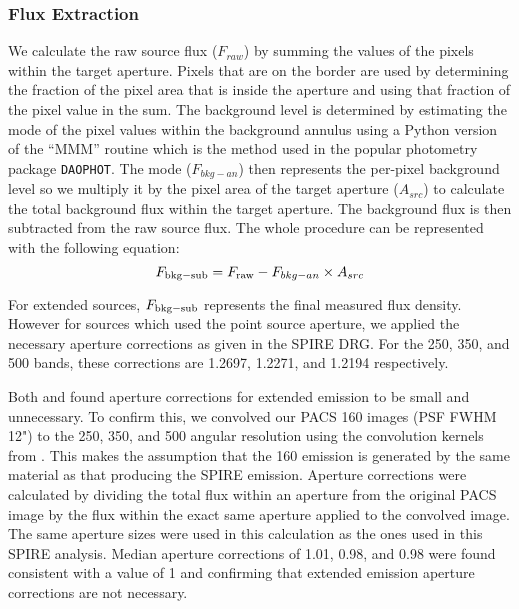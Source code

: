 \subsubsection{Flux Extraction}
We calculate the raw source flux ($F_{raw}$) by summing the values of the pixels within the target aperture. Pixels that are on the border are used by determining the fraction of the pixel area that is inside the aperture and using that fraction of the pixel value in the sum. The background level is determined by estimating the mode of the pixel values within the background annulus using a Python version of the ``MMM'' routine which is the method used in the popular photometry package \texttt{DAOPHOT}. The mode ($F_{bkg-an}$) then represents the per-pixel background level so we multiply it by the pixel area of the target aperture ($A_{src}$) to calculate the total background flux within the target aperture. The background flux is then subtracted from the raw source flux. The whole procedure can be represented with the following equation:
\begin{equation}
F_{\rm{bkg-sub}} = F_{\rm{raw}} - F_{bkg-an} \times A_{src}
\end{equation}

For extended sources, $F_{\rm{bkg-sub}}$ represents the final measured flux density. However for sources which used the point source aperture, we applied the necessary aperture corrections as given in the SPIRE DRG. For the 250, 350, and 500 \um{} bands, these corrections are 1.2697, 1.2271, and 1.2194 respectively. 

Both \citet{Ciesla:2012lq} and \citet{Dale:2012dq} found aperture corrections for extended emission to be small and unnecessary.  To confirm this, we convolved our PACS 160 \um{} images (PSF FWHM 12") to the 250, 350, and 500 \um{} angular resolution using the convolution kernels from \citet{Aniano:2011rr}. This makes the assumption that the 160 \um{} emission is generated by the same material as that producing the SPIRE emission. Aperture corrections were calculated by dividing the total flux within an aperture from the original PACS image by the flux within the exact same aperture applied to the convolved image. The same aperture sizes were used in this calculation as the ones used in this SPIRE analysis. Median aperture corrections of 1.01, 0.98, and 0.98 were found consistent with a value of 1 and confirming that extended emission aperture corrections are not necessary.